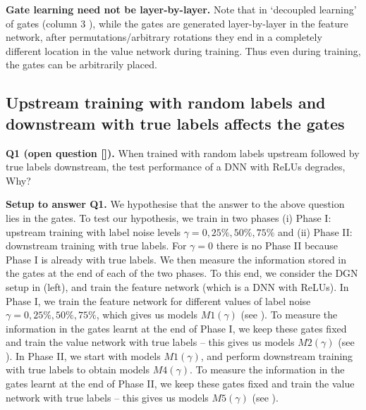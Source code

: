 \textbf{Gate learning need not be layer-by-layer.} Note that  in `decoupled learning' of gates (column $3$ ), while the gates are generated layer-by-layer in the feature network, after permutations/arbitrary rotations they end in a completely different location in the value network during training. Thus even during training, the gates can be arbitrarily placed.

\subsection{Upstream training with random labels and downstream with true labels affects the gates}\label{sec:exp2}


\textbf{Q1 (open question []).} {When trained with random labels upstream followed by true labels downstream, the test performance of a DNN with ReLUs degrades, Why?}

\textbf{Setup to answer Q1.} We hypothesise that the answer to the above question lies in the gates. To test our hypothesis, we train in two phases (i) Phase I: upstream training with label noise levels $\gamma=0, 25\%, 50\%, 75\%$ and (ii) Phase II: downstream training with true labels. For $\gamma=0$ there is no Phase II because Phase I is already with true labels. We then measure the information stored in the gates at the end of each of the two phases. To this end, we consider the DGN setup in  (left), and train the feature network (which is a DNN with ReLUs). In Phase I, we train the feature network for different values of label noise $\gamma=0, 25\%, 50\%, 75\%$, which gives us models $M1(\gamma)$ (see ). To measure the information in the gates learnt at the end of Phase I, we keep these gates fixed and train the value network with true labels -- this gives us models $M2(\gamma)$ (see ). In Phase II, we start with models $M1(\gamma)$, and perform downstream training with true labels to obtain models $M4(\gamma)$.  To measure the information in the gates learnt at the end of Phase II, we keep these gates fixed and train the value network with true labels -- this gives us models $M5(\gamma)$ (see ).


